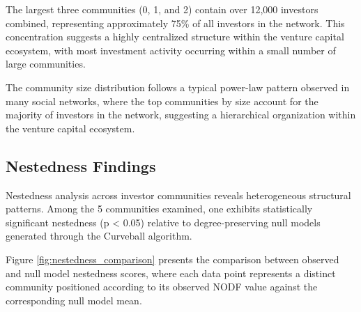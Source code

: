 \documentclass[12pt]{article}
\begin{document}
The largest three communities (0, 1, and 2) contain over 12,000 investors combined, representing approximately 75\% of all investors in the network. This concentration suggests a highly centralized structure within the venture capital ecosystem, with most investment activity occurring within a small number of large communities. 


The community size distribution follows a typical power-law pattern observed in many social networks, where the top \numTopCommunities{} communities by size account for the majority of investors in the network, suggesting a hierarchical organization within the venture capital ecosystem.


\subsection{Nestedness Findings}

\newcommand{\numCommAnalysedNestedness}{5}

Nestedness analysis across investor communities reveals heterogeneous structural patterns. Among the \numCommAnalysedNestedness{} communities examined, one exhibits statistically significant nestedness (p < 0.05) relative to degree-preserving null models generated through the Curveball algorithm.

Figure \ref{fig:nestedness_comparison} presents the comparison between observed and null model nestedness scores, where each data point represents a distinct community positioned according to its observed NODF value against the corresponding null model mean.
\end{document}
